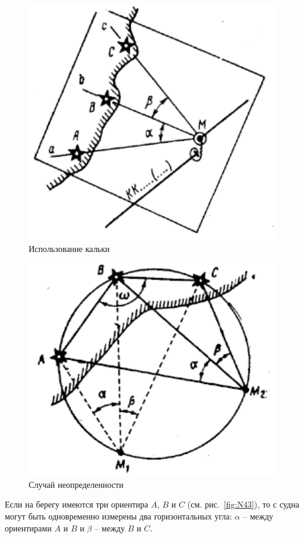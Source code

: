 \documentclass[a4paper, 12pt, twoside, final, book, russian, fittopage, cyremdash]{ncc}
\newcommand{\ris}[1]{\ref{fig:#1}}
\begin{document}
\begin{figure}[htb]
  \centering{}
  \includegraphics{N044}
  \caption{Использование кальки}
  \label{fig:N44}
\end{figure}

\begin{figure}[htb]
  \centering{}
  \includegraphics{N045}
  \caption{Случай неопределенности}
  \label{fig:N45}
\end{figure}

Если на берегу имеются три ориентира $A$, $B$ и $C$ (см. рис.~\ris{N43}), то с судна могут быть одновременно измерены два горизонтальных угла: $\alpha$ \--- между ориентирами $A$ и $B$ и $\beta$ \--- между $B$ и $C$. 
\end{document}
